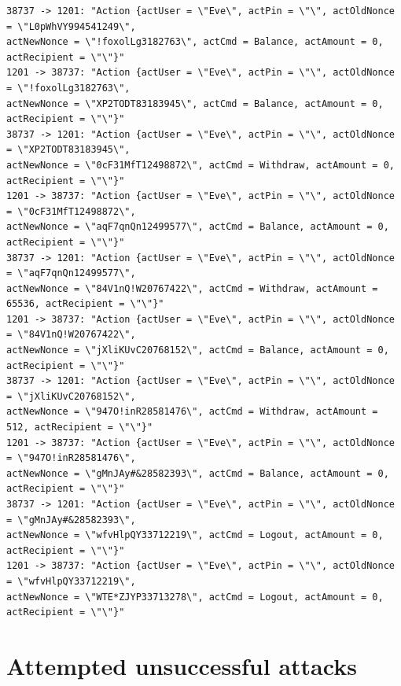 \documentclass[12pt]{article}
\begin{document}
\begin{Verbatim}[frame=single,fontsize=\scriptsize]
38737 -> 1201: "Action {actUser = \"Eve\", actPin = \"\", actOldNonce = \"L0pWhVY994541249\", 
actNewNonce = \"!foxolLg3182763\", actCmd = Balance, actAmount = 0, actRecipient = \"\"}"
1201 -> 38737: "Action {actUser = \"Eve\", actPin = \"\", actOldNonce = \"!foxolLg3182763\", 
actNewNonce = \"XP2TODT83183945\", actCmd = Balance, actAmount = 0, actRecipient = \"\"}"
38737 -> 1201: "Action {actUser = \"Eve\", actPin = \"\", actOldNonce = \"XP2TODT83183945\", 
actNewNonce = \"0cF31MfT12498872\", actCmd = Withdraw, actAmount = 0, actRecipient = \"\"}"
1201 -> 38737: "Action {actUser = \"Eve\", actPin = \"\", actOldNonce = \"0cF31MfT12498872\", 
actNewNonce = \"aqF7qnQn12499577\", actCmd = Balance, actAmount = 0, actRecipient = \"\"}"
38737 -> 1201: "Action {actUser = \"Eve\", actPin = \"\", actOldNonce = \"aqF7qnQn12499577\", 
actNewNonce = \"84V1nQ!W20767422\", actCmd = Withdraw, actAmount = 65536, actRecipient = \"\"}"
1201 -> 38737: "Action {actUser = \"Eve\", actPin = \"\", actOldNonce = \"84V1nQ!W20767422\", 
actNewNonce = \"jXliKUvC20768152\", actCmd = Balance, actAmount = 0, actRecipient = \"\"}"
38737 -> 1201: "Action {actUser = \"Eve\", actPin = \"\", actOldNonce = \"jXliKUvC20768152\", 
actNewNonce = \"947O!inR28581476\", actCmd = Withdraw, actAmount = 512, actRecipient = \"\"}"
1201 -> 38737: "Action {actUser = \"Eve\", actPin = \"\", actOldNonce = \"947O!inR28581476\", 
actNewNonce = \"gMnJAy#&28582393\", actCmd = Balance, actAmount = 0, actRecipient = \"\"}"
38737 -> 1201: "Action {actUser = \"Eve\", actPin = \"\", actOldNonce = \"gMnJAy#&28582393\", 
actNewNonce = \"wfvHlpQY33712219\", actCmd = Logout, actAmount = 0, actRecipient = \"\"}"
1201 -> 38737: "Action {actUser = \"Eve\", actPin = \"\", actOldNonce = \"wfvHlpQY33712219\", 
actNewNonce = \"WTE*ZJYP33713278\", actCmd = Logout, actAmount = 0, actRecipient = \"\"}"
\end{Verbatim}
\section*{Attempted unsuccessful attacks}
\end{document}
